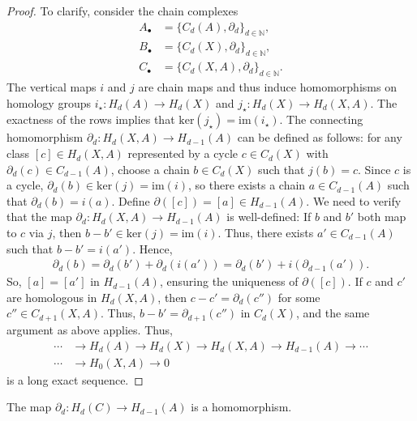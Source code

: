 \begin{proof}
	To clarify, consider the chain complexes
	\begin{align}
		A_{\bullet} & = \{C_{d}(A), \partial_{d}\}_{d \in \mathbb{N}},    \\
		B_{\bullet} & = \{C_{d}(X), \partial_{d}\}_{d \in \mathbb{N}},    \\
		C_{\bullet} & = \{C_{d}(X, A), \partial_{d}\}_{d \in \mathbb{N}}. 
	\end{align}
	The vertical maps \(i\) and \(j\) are chain maps and thus induce homomorphisms on homology groups \(i_{\star}: H_{d}(A) \rightarrow H_{d}(X)\) and \(j_{\star}: H_{d}(X) \rightarrow H_{d}(X, A)\). The exactness of the rows implies that \(\mathrm{ker}(j_{\star}) = \mathrm{im}(i_{\star})\). The connecting homomorphism \(\partial_d: H_{d}(X, A) \rightarrow H_{d-1}(A)\) can be defined as follows: for any class \([c] \in H_{d}(X, A)\) represented by a cycle \(c \in C_{d}(X)\) with \(\partial_{d}(c) \in C_{d-1}(A)\), choose a chain \(b \in C_{d}(X)\) such that \(j(b) = c\). Since \(c\) is a cycle, \(\partial_{d}(b) \in \mathrm{ker}(j) = \mathrm{im}(i)\), so there exists a chain \(a \in C_{d-1}(A)\) such that \(\partial_{d}(b) = i(a)\). Define \(\partial([c]) = [a] \in H_{d-1}(A)\). We need to verify that the map \(\partial_d: H_{d}(X, A) \rightarrow H_{d-1}(A)\) is well-defined: If \(b\) and \(b'\) both map to \(c\) via \(j\), then \(b - b' \in \mathrm{ker}(j) = \mathrm{im}(i)\). Thus, there exists \(a' \in C_{d-1}(A)\) such that \(b - b' = i(a')\). Hence,
	\begin{align}
		\partial_{d}(b) = \partial_{d}(b') + \partial_{d}(i(a')) = \partial_{d}(b') + i(\partial_{d-1}(a')). 
	\end{align}
	So, \([a] = [a']\) in \(H_{d-1}(A)\), ensuring the uniqueness of \(\partial([c])\). If \(c\) and \(c'\) are homologous in \(H_{d}(X, A)\), then \(c - c' = \partial_{d}(c'')\) for some \(c'' \in C_{d+1}(X, A)\). Thus, \(b - b' = \partial_{d+1}(c'')\) in \(C_{d}(X)\), and the same argument as above applies. Thus,
	\begin{align}
		\cdots &\rightarrow H_{d}(A) \rightarrow H_{d}(X) \rightarrow H_{d}(X, A) \rightarrow H_{d-1}(A) \rightarrow \cdots \\
		\cdots &\rightarrow H_{0}(X, A) \rightarrow 0                                                                    
	\end{align}
	is a long exact sequence.
\end{proof}

\begin{proposition}
	The map \(\partial_{d}: H_{d}(C) \rightarrow H_{d-1}(A)\) is a homomorphism.
\end{proposition}

